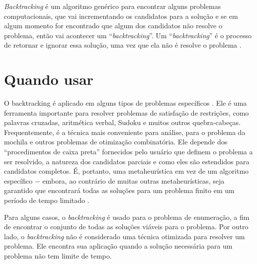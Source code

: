 \emph{Backtracking} é um algoritmo genérico para encontrar alguns
problemas computacionais, que vai incrementando os candidatos para a solução
e se em algum momento for encontrado que algum dos candidatos não resolve
o problema, então vai acontecer um ``\emph{backtracking}''. Um ``\emph{backtracking}''
é o processo de retornar e ignorar essa solução, uma vez que ela não é resolve
o problema \cite{BacktrackingAlgorithmsExplained}.

\section{Quando usar}

O backtracking é aplicado em alguns tipos de problemas específicos \cite{Backtracking}.
Ele é uma ferramenta importante para resolver problemas de satisfação de restrições, como palavras cruzadas, aritmética verbal, Sudoku e muitos outros quebra-cabeças. 
Frequentemente, é a técnica mais conveniente para análise, para o problema da mochila e outros problemas de otimização combinatória. 
Ele depende dos ``procedimentos de caixa preta'' fornecidos pelo usuário que definem o problema a ser resolvido, a natureza dos candidatos parciais e como eles são estendidos para candidatos completos. 
É, portanto, uma metaheurística em vez de um algoritmo específico $-$ embora, ao contrário de muitas outras metaheurísticas, seja garantido que encontrará todas as soluções para um problema finito em um período de tempo limitado \cite{backtracking-algorithms}. 

Para alguns casos, o \emph{backtracking} é usado para o problema de enumeração, a fim de encontrar o conjunto de todas as soluções viáveis para o problema.
Por outro lado, o \emph{backtracking} não é considerado uma técnica otimizada para resolver um problema. 
Ele encontra sua aplicação quando a solução necessária para um problema não tem limite de tempo.